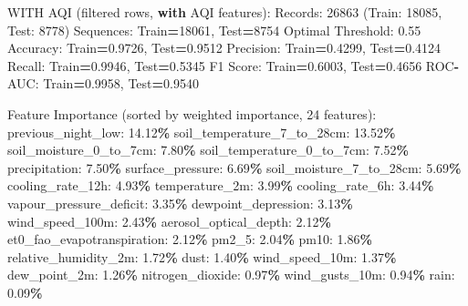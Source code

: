 \documentclass[
  letterpaper,
  DIV=11,
  numbers=noendperiod]{scrartcl}
\newenvironment{Shaded}{\begin{snugshade}}{\end{snugshade}}
\newcommand{\BuiltInTok}[1]{#1}
\newcommand{\ControlFlowTok}[1]{\textcolor[rgb]{0.13,0.29,0.53}{\textbf{#1}}}
\newcommand{\DecValTok}[1]{\textcolor[rgb]{0.00,0.00,0.81}{#1}}
\newcommand{\FloatTok}[1]{\textcolor[rgb]{0.00,0.00,0.81}{#1}}
\newcommand{\NormalTok}[1]{#1}
\newcommand{\OperatorTok}[1]{\textcolor[rgb]{0.81,0.36,0.00}{\textbf{#1}}}
\begin{document}
\begin{Shaded}
\begin{Highlighting}[]
\NormalTok{WITH AQI (filtered rows, }\ControlFlowTok{with}\NormalTok{ AQI features):}
\NormalTok{  Records: }\DecValTok{26863}\NormalTok{ (Train: }\DecValTok{18085}\NormalTok{, Test: }\DecValTok{8778}\NormalTok{)}
\NormalTok{  Sequences: Train}\OperatorTok{=}\DecValTok{18061}\NormalTok{, Test}\OperatorTok{=}\DecValTok{8754}
\NormalTok{  Optimal Threshold: }\FloatTok{0.55}
\NormalTok{  Accuracy: Train}\OperatorTok{=}\FloatTok{0.9726}\NormalTok{, Test}\OperatorTok{=}\FloatTok{0.9512}
\NormalTok{  Precision: Train}\OperatorTok{=}\FloatTok{0.4299}\NormalTok{, Test}\OperatorTok{=}\FloatTok{0.4124}
\NormalTok{  Recall: Train}\OperatorTok{=}\FloatTok{0.9946}\NormalTok{, Test}\OperatorTok{=}\FloatTok{0.5345}
\NormalTok{  F1 Score: Train}\OperatorTok{=}\FloatTok{0.6003}\NormalTok{, Test}\OperatorTok{=}\FloatTok{0.4656}
\NormalTok{  ROC}\OperatorTok{{-}}\NormalTok{AUC: Train}\OperatorTok{=}\FloatTok{0.9958}\NormalTok{, Test}\OperatorTok{=}\FloatTok{0.9540}

\NormalTok{  Feature Importance (}\BuiltInTok{sorted}\NormalTok{ by weighted importance, }\DecValTok{24}\NormalTok{ features):}
\NormalTok{    previous\_night\_low: }\FloatTok{14.12}\OperatorTok{\%}
\NormalTok{    soil\_temperature\_7\_to\_28cm: }\FloatTok{13.52}\OperatorTok{\%}
\NormalTok{    soil\_moisture\_0\_to\_7cm: }\FloatTok{7.80}\OperatorTok{\%}
\NormalTok{    soil\_temperature\_0\_to\_7cm: }\FloatTok{7.52}\OperatorTok{\%}
\NormalTok{    precipitation: }\FloatTok{7.50}\OperatorTok{\%}
\NormalTok{    surface\_pressure: }\FloatTok{6.69}\OperatorTok{\%}
\NormalTok{    soil\_moisture\_7\_to\_28cm: }\FloatTok{5.69}\OperatorTok{\%}
\NormalTok{    cooling\_rate\_12h: }\FloatTok{4.93}\OperatorTok{\%}
\NormalTok{    temperature\_2m: }\FloatTok{3.99}\OperatorTok{\%}
\NormalTok{    cooling\_rate\_6h: }\FloatTok{3.44}\OperatorTok{\%}
\NormalTok{    vapour\_pressure\_deficit: }\FloatTok{3.35}\OperatorTok{\%}
\NormalTok{    dewpoint\_depression: }\FloatTok{3.13}\OperatorTok{\%}
\NormalTok{    wind\_speed\_100m: }\FloatTok{2.43}\OperatorTok{\%}
\NormalTok{    aerosol\_optical\_depth: }\FloatTok{2.12}\OperatorTok{\%}
\NormalTok{    et0\_fao\_evapotranspiration: }\FloatTok{2.12}\OperatorTok{\%}
\NormalTok{    pm2\_5: }\FloatTok{2.04}\OperatorTok{\%}
\NormalTok{    pm10: }\FloatTok{1.86}\OperatorTok{\%}
\NormalTok{    relative\_humidity\_2m: }\FloatTok{1.72}\OperatorTok{\%}
\NormalTok{    dust: }\FloatTok{1.40}\OperatorTok{\%}
\NormalTok{    wind\_speed\_10m: }\FloatTok{1.37}\OperatorTok{\%}
\NormalTok{    dew\_point\_2m: }\FloatTok{1.26}\OperatorTok{\%}
\NormalTok{    nitrogen\_dioxide: }\FloatTok{0.97}\OperatorTok{\%}
\NormalTok{    wind\_gusts\_10m: }\FloatTok{0.94}\OperatorTok{\%}
\NormalTok{    rain: }\FloatTok{0.09}\OperatorTok{\%}


\end{Highlighting}
\end{Shaded}
\end{document}
